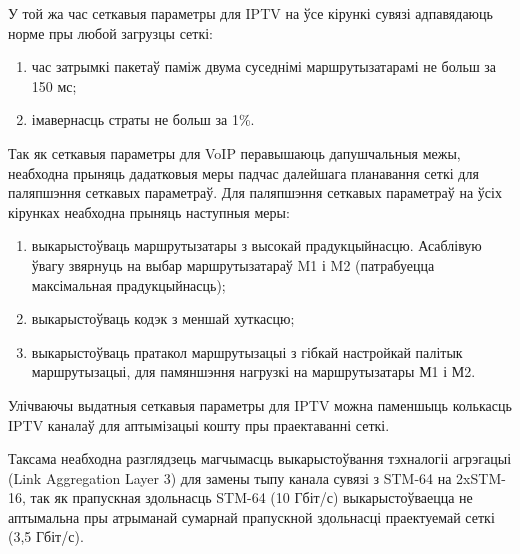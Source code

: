 У той жа час сеткавыя параметры для IPTV на ўсе кірункі сувязі
адпавядаюць норме пры любой загрузцы сеткі:
\begin{enumerate}
    \item час затрымкі пакетаў паміж двума суседнімі маршрутызатарамі
          не больш за 150 мс;
    \item імавернасць страты не больш за 1\%.
\end{enumerate}

Так як сеткавыя параметры для VoIP перавышаюць дапушчальныя межы,
неабходна прыняць дадатковыя меры падчас далейшага планавання
сеткі для паляпшэння сеткавых параметраў.
Для паляпшэння сеткавых параметраў на ўсіх кірунках неабходна
прыняць наступныя меры:
\begin{enumerate}
    \item выкарыстоўваць маршрутызатары з высокай прадукцыйнасцю.
          Асаблівую ўвагу звярнуць на выбар маршрутызатараў
          M1 і M2 (патрабуецца максімальная прадукцыйнасць);
    \item выкарыстоўваць кодэк з меншай хуткасцю;
    \item выкарыстоўваць пратакол маршрутызацыі з гібкай настройкай
          палітык маршрутызацыі, для памяншэння нагрузкі на
          маршрутызатары М1 і М2.
\end{enumerate}

Улічваючы выдатныя сеткавыя параметры для IPTV можна паменшыць
колькасць IPTV каналаў для аптымізацыі кошту пры праектаванні сеткі.

Таксама неабходна разглядзець магчымасць выкарыстоўвання тэхналогіі
агрэгацыі (Link Aggregation Layer 3) для замены тыпу канала сувязі з
STM-64 на 2xSTM-16, так як прапускная здольнасць
STM-64 (10 Гбіт/с) выкарыстоўваецца
не аптымальна пры атрыманай сумарнай прапускной здольнасці
праектуемай сеткі (3,5 Гбіт/с).
